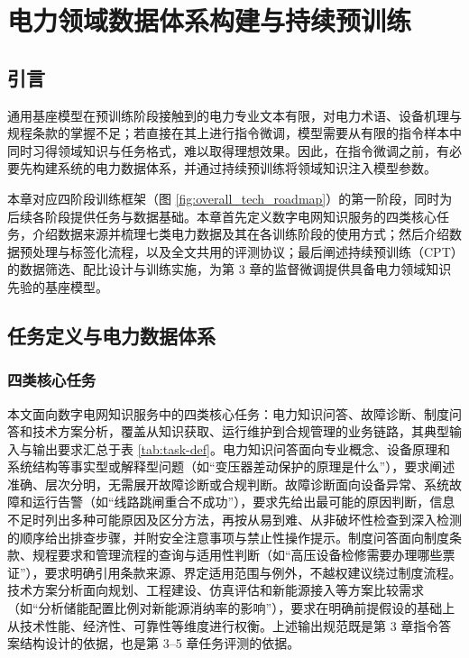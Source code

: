 \documentclass[fontset=fandol,type=master,campus=shenzhen,etitleauto=true]{hithesisbook}
\begin{document}
\chapter{电力领域数据体系构建与持续预训练}\label{ux9762ux5411ux7535ux529bux77e5ux8bc6ux670dux52a1ux7684ux5927ux8bedux8a00ux6a21ux578bux603bux4f53ux6846ux67b6}

\section{引言}\label{sec:ch2-intro}

通用基座模型在预训练阶段接触到的电力专业文本有限，对电力术语、设备机理与规程条款的掌握不足；若直接在其上进行指令微调，模型需要从有限的指令样本中同时习得领域知识与任务格式，难以取得理想效果。因此，在指令微调之前，有必要先构建系统的电力数据体系，并通过持续预训练将领域知识注入模型参数。

本章对应四阶段训练框架（图 \ref{fig:overall_tech_roadmap}）的第一阶段，同时为后续各阶段提供任务与数据基础。本章首先定义数字电网知识服务的四类核心任务，介绍数据来源并梳理七类电力数据及其在各训练阶段的使用方式；然后介绍数据预处理与标签化流程，以及全文共用的评测协议；最后阐述持续预训练（CPT）的数据筛选、配比设计与训练实施，为第 3 章的监督微调提供具备电力领域知识先验的基座模型。

\section{任务定义与电力数据体系}\label{sec:task-data}

\subsection{四类核心任务}\label{ux4efbux52a1ux5b9aux4e49}

本文面向数字电网知识服务中的四类核心任务：电力知识问答、故障诊断、制度问答和技术方案分析，覆盖从知识获取、运行维护到合规管理的业务链路，其典型输入与输出要求汇总于表 \ref{tab:task-def}。电力知识问答面向专业概念、设备原理和系统结构等事实型或解释型问题（如``变压器差动保护的原理是什么''），要求阐述准确、层次分明，无需展开故障诊断或合规判断。故障诊断面向设备异常、系统故障和运行告警（如``线路跳闸重合不成功''），要求先给出最可能的原因判断，信息不足时列出多种可能原因及区分方法，再按从易到难、从非破坏性检查到深入检测的顺序给出排查步骤，并附安全注意事项与禁止性操作提示。制度问答面向制度条款、规程要求和管理流程的查询与适用性判断（如``高压设备检修需要办理哪些票证''），要求明确引用条款来源、界定适用范围与例外，不越权建议绕过制度流程。技术方案分析面向规划、工程建设、仿真评估和新能源接入等方案比较需求（如``分析储能配置比例对新能源消纳率的影响''），要求在明确前提假设的基础上从技术性能、经济性、可靠性等维度进行权衡。上述输出规范既是第 3 章指令答案结构设计的依据，也是第 3--5 章任务评测的依据。
\end{document}
